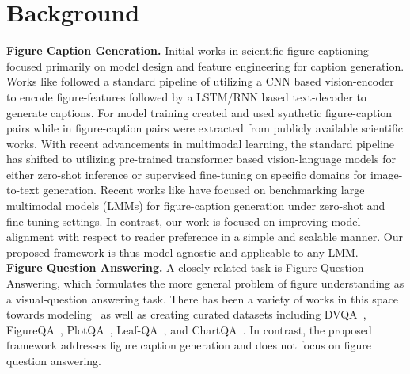 \documentclass[11pt]{article}
\renewcommand{\cite}[1]{\citep{#1}}
\begin{document}

\section{Background} \label{sec:related-work}

\textbf{Figure Caption Generation.}
Initial works in scientific figure captioning focused primarily on model design and feature engineering for caption generation. Works like  \citet{siegel2016figureseer, capunits2021, qian2020formative, chen2019neural, chen2019figure, chen2020figure, hsu-etal-2021-scicap-generating} followed a standard pipeline of utilizing a CNN based vision-encoder to encode figure-features followed by a LSTM/RNN based text-decoder to generate captions. For model training \citet{chen2019neural, chen2019figure, chen2020figure} created and used synthetic figure-caption pairs while in \cite{siegel2016figureseer, hsu-etal-2021-scicap-generating} figure-caption pairs were extracted from publicly available scientific works. With recent advancements in multimodal learning, the standard pipeline has shifted to utilizing pre-trained transformer based vision-language models for either zero-shot inference or supervised fine-tuning on specific domains for image-to-text generation. Recent works like \cite{roberts2024scifibench} have focused on benchmarking large multimodal models (LMMs) for figure-caption generation under zero-shot and fine-tuning settings. In contrast, our work is focused on improving model alignment with respect to reader preference in a simple and scalable manner. Our proposed framework is thus model agnostic and applicable to any LMM.
\\
\textbf{Figure Question Answering.}
A closely related task is Figure Question Answering, which formulates the more general problem of figure understanding as a visual-question answering task. There has been a variety of works in this space towards modeling~\cite{siegel2016figureseer,kahou2017figureqa,li2022multi,singh2020stl,zou2020affinity, kafle2018dvqa, kafle2020answering} as well as creating curated datasets including DVQA~\cite{kafle2018dvqa}, FigureQA~\cite{kahou2017figureqa}, PlotQA~\cite{methani2020plotqa}, Leaf-QA~\cite{chaudhry2020leaf}, and ChartQA~\cite{masry2022chartqa}. In contrast, the proposed framework addresses figure caption generation and does not focus on figure question answering.
\end{document}
